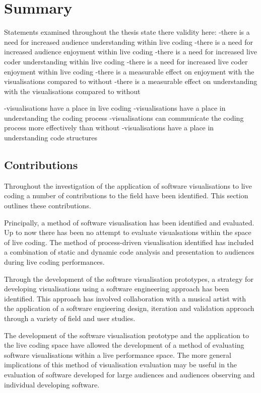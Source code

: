 
\chapter{Summary}
\label{chap:summary}

Statements examined throughout the thesis {\color{red} state there validity here}:
-there is a need for increased audience understanding within live coding
-there is a need for increased audience enjoyment within live coding
-there is a need for increased live coder understanding within live coding
-there is a need for increased live coder enjoyment within live coding
-there is a measurable effect on enjoyment with the visualisations compared to without
-there is a measurable effect on understanding with the visualisations compared to without

-visualisations have a place in live coding
-visualisations have a place in understanding the coding process
-visualisations can communicate the coding process more effectively than without
-visualisations have a place in understanding code structures

\section{Contributions}

Throughout the investigation of the application of software visualisations to live coding a number of contributions to the field have been identified. This section outlines these contributions.

Principally, a method of software visualisation has been identified and evaluated. Up to now there has been no attempt to evaluate visualsations within the space of live coding. The method of process-driven visualisation identified has included a combination of static and dynamic code analysis and presentation to audiences during live coding performances.

Through the development of the software visualisation prototypes, a strategy for developing visualisations using a software engineering approach has been identified. This approach has involved collaboration with a musical artist with the application of a software engieering design, iteration and validation approach through a variety of field and user studies.

The development of the software visualisation prototype and the application to the live coding space have allowed the development of a method of evaluating software visualisations within a live performance space. The more general implications of this method of visualisation evaluation may be useful in the evaluation of software developed for large audiences and audiences observing and individual developing software.


